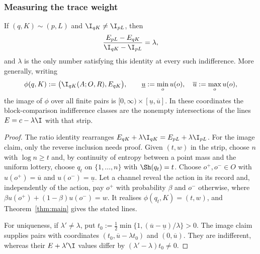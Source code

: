 \subsubsection{Measuring the trace weight}
\label{app:measurement-proofs}

\begin{proposition}
\label{prop:single-price}\label{lem:info-payoff-plane}
If $(q,K)\sim(p,L)$ and $\I_{qK}\ne\I_{pL}$, then
\[
 \frac{E_{pL}-E_{qK}}{\I_{qK}-\I_{pL}}=\lambda,
\]
and $\lambda$ is the only number satisfying this identity at every such
indifference.  More generally, writing
\[
 \phi(q,K):=\bigl(\I_{qK}(A;O,R),E_{qK}\bigr),\qquad
 \underline u:=\min_o u(o),\quad \overline u:=\max_o u(o),
\]
the image of $\phi$ over all finite pairs is
$[0,\infty)\times[\underline u,\overline u]$.  In these coordinates the
block-comparison indifference classes are the nonempty intersections of the
lines $E=c-\lambda\I$ with that strip.
\end{proposition}

\begin{proof}
The ratio identity rearranges
$E_{qK}+\lambda\I_{qK}=E_{pL}+\lambda\I_{pL}$.
For the image claim, only the reverse inclusion needs proof.  Given
$(t,w)$ in the strip, choose $n$ with $\log n\ge t$ and, by continuity of
entropy between a point mass and the uniform lottery, choose $q_t$ on
$\{1,\ldots,n\}$ with $\Sh(q_t)=t$.  Choose $o^+,o^-\in O$ with
$u(o^+)=\overline u$ and $u(o^-)=\underline u$.  Let a channel reveal the
action in its record and, independently of the action, pay $o^+$ with
probability $\beta$ and $o^-$ otherwise, where
$\beta u(o^+)+(1-\beta)u(o^-)=w$.  It realises
$\phi(q_t,K)=(t,w)$, and Theorem~\ref{thm:main} gives the stated lines.

For uniqueness, if $\lambda'\ne\lambda$, put
$t_0:=\tfrac12\min\{1,(\overline u-\underline u)/\lambda\}>0$.
The image claim supplies pairs with coordinates
$(t_0,\overline u-\lambda t_0)$ and $(0,\overline u)$.  They are indifferent,
whereas their $E+\lambda'\I$ values differ by
$(\lambda'-\lambda)t_0\ne0$.
\end{proof}

